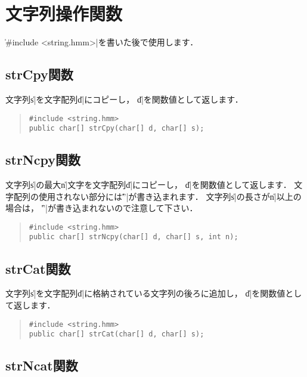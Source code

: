 \section{文字列操作関数}

\|#include <string.hmm>|を書いた後で使用します．

\subsection{strCpy関数}

文字列\|s|を文字配列\|d|にコピーし，
\|d|を関数値として返します．

\begin{quote}
\begin{verbatim}
#include <string.hmm>
public char[] strCpy(char[] d, char[] s);
\end{verbatim}
\end{quote}

\subsection{strNcpy関数}

文字列\|s|の最大\|n|文字を文字配列\|d|にコピーし，
\|d|を関数値として返します．
文字配列の使用されない部分には\|'\0'|が書き込まれます．
文字列\|s|の長さが\|n|以上の場合は，
\|'\0'|が書き込まれないので注意して下さい．

\begin{quote}
\begin{verbatim}
#include <string.hmm>
public char[] strNcpy(char[] d, char[] s, int n);
\end{verbatim}
\end{quote}

\subsection{strCat関数}

文字列\|s|を文字配列\|d|に格納されている文字列の後ろに追加し，
\|d|を関数値として返します．

\begin{quote}
\begin{verbatim}
#include <string.hmm>
public char[] strCat(char[] d, char[] s);
\end{verbatim}
\end{quote}

\subsection{strNcat関数}

